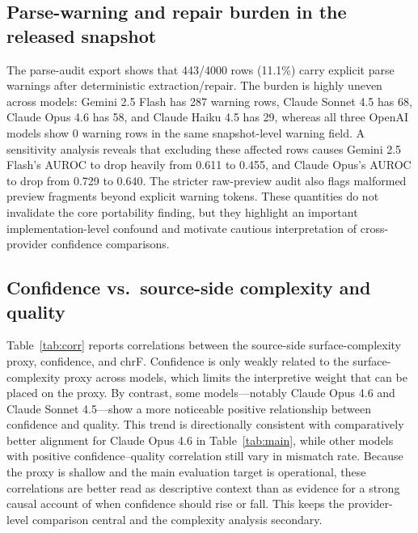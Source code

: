 \documentclass[10pt,conference]{IEEEtran}
\begin{document}
\subsection{Parse-warning and repair burden in the released snapshot}
The parse-audit export shows that 443/4000 rows (11.1\%) carry explicit parse warnings after deterministic extraction/repair. The burden is highly uneven across models: Gemini 2.5 Flash has 287 warning rows, Claude Sonnet 4.5 has 68, Claude Opus 4.6 has 58, and Claude Haiku 4.5 has 29, whereas all three OpenAI models show 0 warning rows in the same snapshot-level warning field. A sensitivity analysis reveals that excluding these affected rows causes Gemini 2.5 Flash's AUROC to drop heavily from 0.611 to 0.455, and Claude Opus's AUROC to drop from 0.729 to 0.640. The stricter raw-preview audit also flags malformed preview fragments beyond explicit warning tokens. These quantities do not invalidate the core portability finding, but they highlight an important implementation-level confound and motivate cautious interpretation of cross-provider confidence comparisons.

\subsection{Confidence vs.\ source-side complexity and quality}
Table~\ref{tab:corr} reports correlations between the source-side surface-complexity proxy, confidence, and chrF. Confidence is only weakly related to the surface-complexity proxy across models, which limits the interpretive weight that can be placed on the proxy. By contrast, some models---notably Claude Opus 4.6 and Claude Sonnet 4.5---show a more noticeable positive relationship between confidence and quality. This trend is directionally consistent with comparatively better alignment for Claude Opus 4.6 in Table~\ref{tab:main}, while other models with positive confidence--quality correlation still vary in mismatch rate. Because the proxy is shallow and the main evaluation target is operational, these correlations are better read as descriptive context than as evidence for a strong causal account of when confidence should rise or fall. This keeps the provider-level comparison central and the complexity analysis secondary.


\end{document}
